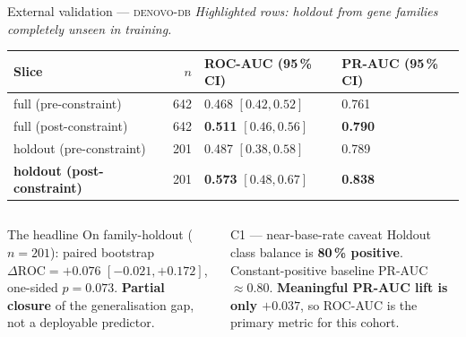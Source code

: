 \documentclass[aspectratio=169,10pt]{beamer}
\begin{document}
\begin{frame}{External validation --- \textsc{denovo-db}}
  \footnotesize
  \centering
  \emph{Highlighted rows: holdout from gene families completely unseen in training.}
  \vspace{0.3em}
  \begin{tabular}{@{} l r l l @{}}
    \toprule
    Slice & $n$ & ROC-AUC (95\,\% CI) & PR-AUC (95\,\% CI) \\
    \midrule
    full (pre-constraint)      & 642 & 0.468 $[0.42, 0.52]$ & 0.761 \\
    full (post-constraint)     & 642 & \textbf{0.511} $[0.46, 0.56]$ & \textbf{0.790} \\
    \rowcolor{yellow!25}
    holdout (pre-constraint)   & 201 & 0.487 $[0.38, 0.58]$ & 0.789 \\
    \rowcolor{yellow!25}
    \textbf{holdout (post-constraint)} & 201 & \textbf{0.573} $[0.48, 0.67]$ & \textbf{0.838} \\
    \bottomrule
  \end{tabular}

  \vspace{0.5em}
  \begin{columns}[T]
    \begin{alertblock}{The headline}
      \scriptsize
      On family-holdout ($n=201$): paired bootstrap
      $\Delta\text{ROC} = +0.076$ $[-0.021, +0.172]$, one-sided
      $p = 0.073$. \textbf{Partial closure} of the generalisation gap,
      not a deployable predictor.
    \end{alertblock}

    \begin{block}{C1 --- near-base-rate caveat}
      \scriptsize
      Holdout class balance is \textbf{80\,\% positive}. Constant-positive
      baseline PR-AUC $\approx 0.80$. \textbf{Meaningful PR-AUC lift is only
      $+0.037$}, so ROC-AUC is the primary metric for this cohort.
    \end{block}
  \end{columns}
\end{frame}
\end{document}
